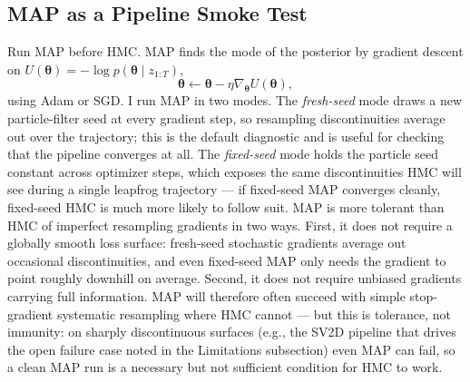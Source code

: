 \documentclass{article}
\renewcommand{\v}[1]{ \ensuremath{ {\mathbf{#1}} }}
\begin{document}

\subsection{MAP as a Pipeline Smoke Test}
\label{sec:map-smoke-test}

Run MAP before HMC. MAP finds the mode of the posterior by gradient descent on $U(\v \theta) = -\log p(\v \theta \mid z_{1:T})$,
\begin{equation}
    \v \theta \leftarrow \v \theta - \eta \nabla_{\v \theta} U(\v \theta),
\end{equation}
using Adam or SGD. I run MAP in two modes. The \emph{fresh-seed} mode draws a new particle-filter seed at every gradient step, so resampling discontinuities average out over the trajectory; this is the default diagnostic and is useful for checking that the pipeline converges at all. The \emph{fixed-seed} mode holds the particle seed constant across optimizer steps, which exposes the same discontinuities HMC will see during a single leapfrog trajectory --- if fixed-seed MAP converges cleanly, fixed-seed HMC is much more likely to follow suit. MAP is more tolerant than HMC of imperfect resampling gradients in two ways. First, it does not require a globally smooth loss surface: fresh-seed stochastic gradients average out occasional discontinuities, and even fixed-seed MAP only needs the gradient to point roughly downhill on average. Second, it does not require unbiased gradients carrying full information. MAP will therefore often succeed with simple stop-gradient systematic resampling where HMC cannot --- but this is tolerance, not immunity: on sharply discontinuous surfaces (e.g., the SV2D pipeline that drives the open failure case noted in the Limitations subsection) even MAP can fail, so a clean MAP run is a necessary but not sufficient condition for HMC to work.
\end{document}
